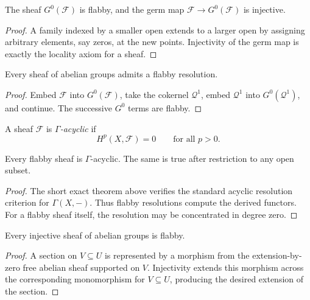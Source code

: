 \begin{proposition}\label{prop:vi46-godement-flabby}
The sheaf $G^0(\mathcal F)$ is flabby, and the germ map $\mathcal F\to G^0(\mathcal F)$ is injective.
\begin{proof}
A family indexed by a smaller open extends to a larger open by assigning arbitrary elements, say zeros, at the new points. Injectivity of the germ map is exactly the locality axiom for a sheaf.
\end{proof}
\end{proposition}


\begin{proposition}\label{prop:vi46-resolution-exists}
Every sheaf of abelian groups admits a flabby resolution.
\begin{proof}
Embed $\mathcal F$ into $G^0(\mathcal F)$, take the cokernel $\mathcal Q^1$, embed $\mathcal Q^1$ into $G^0(\mathcal Q^1)$, and continue. The successive $G^0$ terms are flabby.
\end{proof}
\end{proposition}

\begin{definition}\label{def:vi46-acyclic}
A sheaf $\mathcal F$ is \emph{$\Gamma$-acyclic} if
\[
H^p(X,\mathcal F)=0
\qquad\text{for all }p>0.
\]
\end{definition}

\begin{theorem}\label{thm:vi46-flabby-acyclic}
Every flabby sheaf is $\Gamma$-acyclic. The same is true after restriction to any open subset.
\begin{proof}
The short exact theorem above verifies the standard acyclic resolution criterion for $\Gamma(X,-)$. Thus flabby resolutions compute the derived functors. For a flabby sheaf itself, the resolution may be concentrated in degree zero.
\end{proof}
\end{theorem}


\begin{proposition}\label{prop:vi46-injective}
Every injective sheaf of abelian groups is flabby.
\begin{proof}
A section on $V\subseteq U$ is represented by a morphism from the extension-by-zero free abelian sheaf supported on $V$. Injectivity extends this morphism across the corresponding monomorphism for $V\subseteq U$, producing the desired extension of the section.
\end{proof}
\end{proposition}

